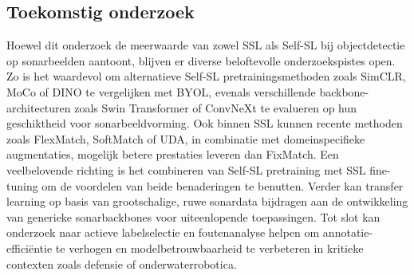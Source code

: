 \documentclass[a0,portrait]{hogent-poster}
\begin{document}
\begin{multicols}{2}
\section{Toekomstig onderzoek}

Hoewel dit onderzoek de meerwaarde van zowel SSL als Self-SL bij objectdetectie op sonarbeelden aantoont, blijven er diverse beloftevolle onderzoekspistes open. Zo is het waardevol om alternatieve Self-SL pretrainingsmethoden zoals SimCLR, MoCo of DINO te vergelijken met BYOL, evenals verschillende backbone-architecturen zoals Swin Transformer of ConvNeXt te evalueren op hun geschiktheid voor sonarbeeldvorming. Ook binnen SSL kunnen recente methoden zoals FlexMatch, SoftMatch of UDA, in combinatie met domeinspecifieke augmentaties, mogelijk betere prestaties leveren dan FixMatch. Een veelbelovende richting is het combineren van Self-SL pretraining met SSL fine-tuning om de voordelen van beide benaderingen te benutten. Verder kan transfer learning op basis van grootschalige, ruwe sonardata bijdragen aan de ontwikkeling van generieke sonarbackbones voor uiteenlopende toepassingen. Tot slot kan onderzoek naar actieve labelselectie en foutenanalyse helpen om annotatie-efficiëntie te verhogen en modelbetrouwbaarheid te verbeteren in kritieke contexten zoals defensie of onderwaterrobotica.

\end{multicols}
\end{document}
